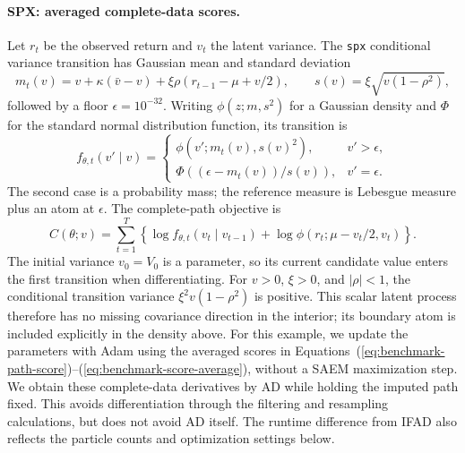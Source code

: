 \documentclass[11pt]{article}
\theoremstyle{thmstylethree}%
\begin{document}
\paragraph{SPX: averaged complete-data scores.}
Let $r_t$ be the observed return and $v_t$ the latent variance.
The \texttt{spx} conditional variance transition has Gaussian mean
and standard deviation
\[
 m_t(v)=v+\kappa(\bar v-v)+\xi\rho(r_{t-1}-\mu+v/2),
 \qquad s(v)=\xi\sqrt{v(1-\rho^2)},
\]
followed by a floor $\epsilon=10^{-32}$.
Writing $\phi(z;m,s^2)$ for a Gaussian density and $\Phi$ for the
standard normal distribution function, its transition is
\[
 f_{\theta,t}(v'\mid v)=
 \begin{cases}
  \phi(v';m_t(v),s(v)^2),&v'>\epsilon,\\
  \Phi((\epsilon-m_t(v))/s(v)),&v'=\epsilon.
 \end{cases}
\]
The second case is a probability mass; the reference measure is Lebesgue
measure plus an atom at $\epsilon$.
The complete-path objective is
\begin{equation}
 C(\theta;v)=\sum_{t=1}^T\left\{
    \log f_{\theta,t}(v_t\mid v_{t-1})
    +\log\phi(r_t;\mu-v_t/2,v_t)\right\}.
 \label{eq:benchmark-spx-score-objective}
\end{equation}
The initial variance $v_0=V_0$ is a parameter, so its current candidate
value enters the first transition when differentiating.
For $v>0$, $\xi>0$, and $|\rho|<1$, the conditional transition variance
$\xi^2v(1-\rho^2)$ is positive. This scalar latent process therefore has
no missing covariance direction in the interior; its boundary atom is
included explicitly in the density above.
For this example, we update the parameters with Adam using the averaged
scores in Equations~(\ref{eq:benchmark-path-score})--(\ref{eq:benchmark-score-average}),
without a SAEM maximization step.
We obtain these complete-data derivatives by AD while holding the imputed
path fixed. This avoids differentiation through the filtering and resampling
calculations, but does not avoid AD itself. The runtime difference from
IFAD also reflects the particle counts and optimization settings below.
\end{document}
